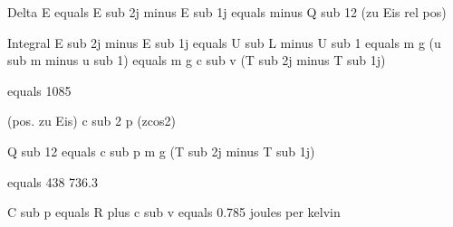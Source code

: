 Delta E equals E sub 2j minus E sub 1j equals minus Q sub 12 (zu Eis rel pos)

Integral E sub 2j minus E sub 1j equals U sub L minus U sub 1 equals m g (u sub m minus u sub 1) equals m g c sub v (T sub 2j minus T sub 1j)

equals 1085

(pos. zu Eis) c sub 2 p (zcos2)

Q sub 12 equals c sub p m g (T sub 2j minus T sub 1j)

equals 438 736.3

C sub p equals R plus c sub v equals 0.785 joules per kelvin